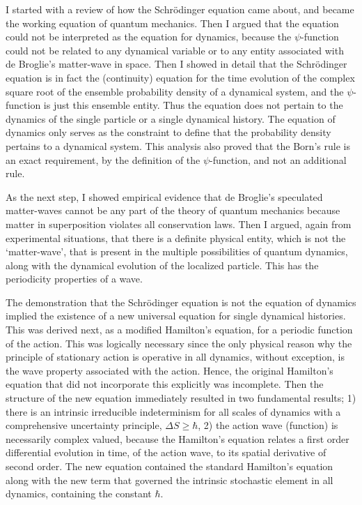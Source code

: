 I started with a review of how the Schr\"{o}dinger equation came about, and became the
working equation of quantum mechanics. Then I argued that the equation could not be
interpreted as the equation for dynamics, because the $\psi$-function could not be related to
any dynamical variable or to any entity associated with de Broglie's matter-wave in space.
Then I showed in detail that the Schr\"{o}dinger equation is in fact the (continuity) equation
for the time evolution of the complex square root of the ensemble probability density of a
dynamical system, and the $\psi$-function is just this ensemble entity. Thus the equation does
not pertain to the dynamics of the single particle or a single dynamical history. The equation
of dynamics only serves as the constraint to define that the probability density pertains to
a dynamical system. This analysis also proved that the Born's rule is an exact requirement,
by the definition of the $\psi$-function, and not an additional rule.

As the next step, I showed empirical evidence that de  Broglie's speculated matter-waves
cannot be any part of the theory of quantum mechanics because matter in superposition
violates all conservation laws. Then I argued, again from experimental situations, that there
is a definite physical entity, which is not the `matter-wave', that is present in the multiple
possibilities of quantum dynamics, along with the dynamical evolution of the localized particle. 
This has the periodicity properties of a wave.

The demonstration that the Schr\"{o}dinger equation is not the equation of dynamics implied
the existence of a new universal equation for single dynamical histories. This was derived
next, as a modified Hamilton's equation, for a periodic function of the action. This was
logically necessary since the only physical reason why the principle of stationary action
is operative in all dynamics, without exception, is the wave property associated with the action. Hence, the
original Hamilton's equation that did not incorporate this explicitly was incomplete. Then
the structure of the new equation immediately resulted in two fundamental results; 1) there
is an intrinsic irreducible indeterminism for all scales of dynamics with a comprehensive
uncertainty principle, $\Delta S \geq  \hbar$, 2) the action wave (function) is necessarily complex valued,
because the Hamilton's equation relates a first order differential evolution in time, of the
action wave, to its spatial derivative of second order. The
new equation contained the standard Hamilton's equation along with the new term that
governed the intrinsic stochastic element in all dynamics, containing the constant $\hbar$.

